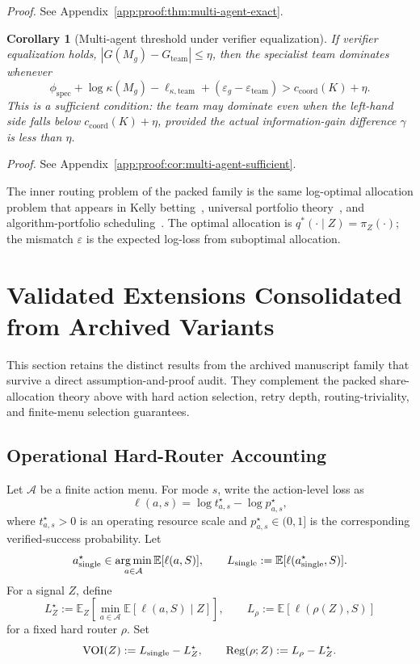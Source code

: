 \documentclass[10pt]{article}
\DeclareMathOperator*{\argmin}{arg\,min}
\theoremstyle{paperplain}
\newtheorem{corollary}[theorem]{Corollary}
\theoremstyle{paperdefinition}
\theoremstyle{paperremark}
\newcommand{\E}{\mathbb{E}}
\begin{document}
\par\noindent\emph{Proof.} See Appendix~\ref{app:proof:thm:multi-agent-exact}.\par


\begin{corollary}[Multi-agent threshold under verifier equalization]
\label{cor:multi-agent-sufficient}
If verifier equalization holds, $|G(M_g) - G_{\mathrm{team}}| \le \eta$, then the specialist team dominates whenever
\[
\phi_{\mathrm{spec}}
+ \log\kappa(M_g)-\ell_{\kappa,\mathrm{team}}
+ (\varepsilon_g - \varepsilon_{\mathrm{team}})
> c_{\mathrm{coord}}(K) + \eta.
\]
This is a \emph{sufficient} condition: the team may dominate even when the left-hand side falls below $c_{\mathrm{coord}}(K) + \eta$, provided the actual information-gain difference $\gamma$ is less than $\eta$.
\end{corollary}

\par\noindent\emph{Proof.} See Appendix~\ref{app:proof:cor:multi-agent-sufficient}.\par


The inner routing problem of the packed family is the same log-optimal allocation problem that appears in Kelly betting~\cite{kelly1956}, universal portfolio theory~\cite{cover-thomas2006}, and algorithm-portfolio scheduling~\cite{gomes-selman2001}. The optimal allocation is $q^*(\cdot \mid Z)=\pi_Z(\cdot)$; the mismatch $\varepsilon$ is the expected log-loss from suboptimal allocation.


\section{Validated Extensions Consolidated from Archived Variants}
\label{sec:consolidated-extensions}

This section retains the distinct results from the archived manuscript family
that survive a direct assumption-and-proof audit.  They complement the packed
share-allocation theory above with hard action selection, retry depth,
routing-triviality, and finite-menu selection guarantees.

\subsection{Operational Hard-Router Accounting}

Let \(\mathcal A\) be a finite action menu.  For mode \(s\), write the
action-level loss as
\[
  \ell(a,s)=\log t^\star_{a,s}-\log p^\star_{a,s},
\]
where \(t^\star_{a,s}>0\) is an operating resource scale and
\(p^\star_{a,s}\in(0,1]\) is the corresponding verified-success
probability.  Let
\[
  a^\star_{\rm single}\in\argmin_{a\in\mathcal A}\E[\ell(a,S)],
  \qquad
  L_{\rm single}:=\E[\ell(a^\star_{\rm single},S)].
\]
For a signal \(Z\), define
\[
  L_Z^\star:=\E_Z\!\left[\min_{a\in\mathcal A}
       \E[\ell(a,S)\mid Z]\right],
  \qquad
  L_\rho:=\E[\ell(\rho(Z),S)]
\]
for a fixed hard router \(\rho\).  Set
\[
  \operatorname{VOI}(Z):=L_{\rm single}-L_Z^\star,
  \qquad
  \operatorname{Reg}(\rho;Z):=L_\rho-L_Z^\star.
\]
\end{document}
